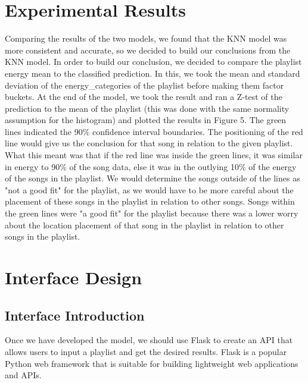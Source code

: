 \documentclass[titlepage]{article}
\begin{document}
\section{Experimental Results}
Comparing the results of the two models, we found that the KNN model was more consistent and accurate, so we decided to build our conclusions from the KNN model. In order to build our conclusion, we decided to compare the playlist energy mean to the classified prediction. In this, we took the mean and standard deviation of the energy\_categories of the playlist before making them factor buckets. At the end of the model, we took the result and ran a Z-test of the prediction to the mean of the playlist (this was done with the same normality assumption for the histogram) and plotted the results in Figure 5. The green lines indicated the 90\% confidence interval boundaries. The positioning of the red line would give us the conclusion for that song in relation to the given playlist. What this meant was that if the red line was inside the green lines, it was similar in energy to 90\% of the song data, else it was in the outlying 10\% of the energy of the songs in the playlist. We would determine the songs outside of the lines as "not a good fit" for the playlist, as we would have to be more careful about the placement of these songs in the playlist in relation to other songs. Songs within the green lines were "a good fit" for the playlist because there was a lower worry about the location placement of that song in the playlist in relation to other songs in the playlist.

\section{Interface Design}
\maketitle
\subsection{Interface Introduction}
Once we have developed the model, we should use Flask to create an API that allows users to input a playlist and get the desired results. Flask is a popular Python web framework that is suitable for building lightweight web applications and APIs.
\end{document}
